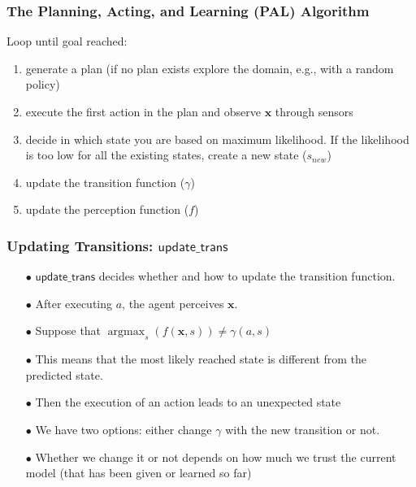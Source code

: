 \documentclass{beamer}
\DeclareMathOperator*{\argmax}{argmax}
\def\updgamma{\mathsf{update\_trans}}
\def\bx{\pmb{x}}
\begin{document}
\begin{frame}
\frametitle{The Planning, Acting, and Learning (PAL) Algorithm}
Loop until goal reached: 
\begin{enumerate}
\item generate a plan (if no plan exists explore the domain, e.g., with a random policy) 
\item execute the first action in the plan and observe $\bx$ through sensors
\item decide in which state you are based on maximum likelihood. If the likelihood  is too low for all the existing states, create a new state ($s_{new}$)
\item \alert<2>{update the transition function ($\gamma$)} 
\item update the perception function ($f$)
\end{enumerate}
\end{frame}



\begin{frame} 
  \frametitle{Updating Transitions: $\updgamma$} 

\begin{itemize}
\item[$\bullet$] 
$\updgamma$ decides whether and how to update the transition function.
\item[$\bullet$]
After executing $a$, the agent perceives $\bx$. 
\item[$\bullet$]
Suppose that $\argmax_{s}(f(\bx,s)) \neq \gamma(a,s)$
\item[$\bullet$]
This means that the most likely reached state is different from the predicted state.
\item[$\bullet$]
Then the execution of an action leads to an unexpected state
\item[$\bullet$]
We have two options: either change $\gamma$ with the new transition or not.
\pause
\item[$\bullet$]
{\color {red} Whether we change it or not depends on how much we trust the current model (that has been given or learned so far)}
\end{itemize}
\end{frame}
\end{document}
